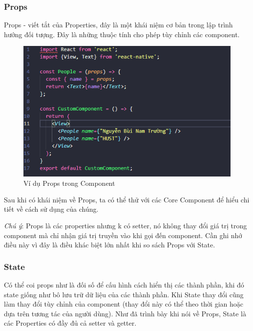 \subsubsection{Props}
    Props - viết tắt của Properties, đây là một khái niệm cơ bản trong lập trình hướng đối tượng. Đây là những thuộc tính cho phép tùy chỉnh các component.
    \begin{figure}[!ht]
        \centering
        \includegraphics[width=1\textwidth]{images/Props.png}
        \caption{Ví dụ Props trong Component}
    \end{figure}

    Sau khi có khái niệm về Props, ta có thể thử với các Core Component để hiểu chi tiết về cách sử dụng của chúng.

    \textit{Chú ý}: Props là các properties nhưng k có setter, nó không thay đổi giá trị trong component mà chỉ nhận giá trị truyền vào khi gọi đến component. Cần ghi nhớ điều này vì đây là điều khác biệt lớn nhất khi so sách Props với State.
\subsubsection{State}
    Có thể coi props như là đối số để cấu hình cách hiển thị các thành phần, khi đó state giống như bô lưu trữ dữ liệu của các thành phần. Khi State thay đổi cũng làm thay đổi tùy chỉnh của component (thay đổi này có thể theo thời gian hoặc dựa trên tương tác của người dùng). Như đã trình bày khi nói về Props, State là các Properties có đầy đủ cả setter và getter.

